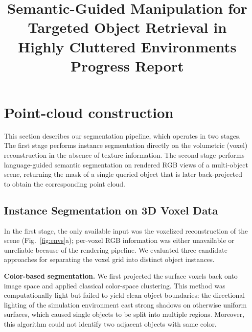 \documentclass[conference,letterpaper,10pt]{IEEEtran}
\begin{document}
\title{Semantic-Guided Manipulation for Targeted Object Retrieval in Highly Cluttered Environments\\
{\large Progress Report}}

\author{
    \and
    \and
    \and
    \and
}

\maketitle

\section{Point-cloud construction}

This section describes our segmentation pipeline, which operates in two
stages. The first stage performs instance segmentation directly on the
volumetric (voxel) reconstruction in the absence of texture information.
The second stage performs language-guided semantic segmentation on
rendered RGB views of a multi-object scene, returning the mask of a
single queried object that is later back-projected to obtain the
corresponding point cloud.

\subsection{Instance Segmentation on 3D Voxel Data}
\label{subsec:instance}

In the first stage, the only available input was the voxelized
reconstruction of the scene (Fig.~\ref{fig:envs}a); per-voxel RGB
information was either unavailable or unreliable because of the
rendering pipeline. We evaluated three candidate approaches for
separating the voxel grid into distinct object instances.

\textbf{Color-based segmentation.} We first projected the surface voxels
back onto image space and applied classical color-space clustering. This
method was computationally light but failed to yield clean object
boundaries: the directional lighting of the simulation environment cast
strong shadows on otherwise uniform surfaces, which caused single
objects to be split into multiple regions. Moreover, this algorithm could not identify two adjacent objects with same color.
\end{document}
